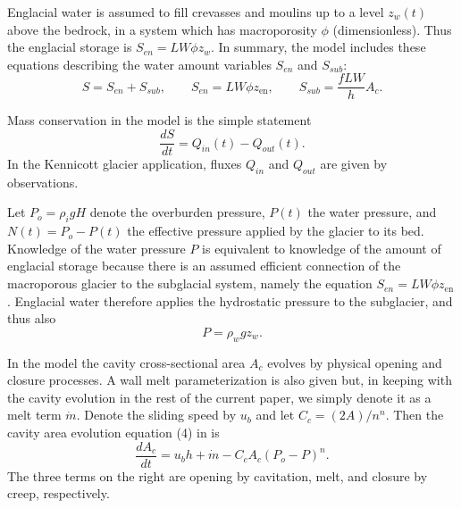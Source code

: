 \documentclass[11pt,final]{amsart}
\newcommand{\zen}{z_{\text{en}}}
\begin{document}
Englacial water is assumed to fill crevasses and moulins up to a level $z_w(t)$ above the bedrock, in a system which has macroporosity $\phi$ (dimensionless).  Thus the englacial storage is $S_{en}=L W \phi z_w$.  In summary, the \cite{Bartholomausetal2011} model includes these equations describing the water amount variables $S_{en}$ and $S_{sub}$:
\begin{equation}
S = S_{en} + S_{sub}, \qquad S_{en} = L W \phi \zen, \qquad S_{sub} = \frac{f L W}{h} A_c.  \label{eq:barth:kinematics}
\end{equation}

Mass conservation in the model is the simple statement  \citep{Bartholomausetal2008}
\begin{equation}
\frac{dS}{dt} = Q_{in}(t) - Q_{out}(t). \label{eq:barth:massconserve}
\end{equation}
In the Kennicott glacier application, fluxes $Q_{in}$ and $Q_{out}$ are given by observations.

Let $P_o=\rho_i g H$ denote the overburden pressure, $P(t)$ the water pressure, and $N(t)=P_o-P(t)$ the effective pressure applied by the glacier to its bed.  Knowledge of the water pressure $P$ is equivalent to knowledge of the amount of englacial storage because there is an assumed efficient connection of the macroporous glacier to the subglacial system, namely the equation $S_{en}=L W \phi \zen$.  Englacial water therefore applies the hydrostatic pressure to the subglacier, and thus also
\begin{equation}
P = \rho_w g z_w.  \label{eq:barth:englacialpressure}
\end{equation}

In the \cite{Bartholomausetal2011} model the cavity cross-sectional area $A_c$ evolves by physical opening and closure processes.  A wall melt parameterization is also given but, in keeping with the cavity evolution in the rest of the current paper, we simply denote it as a melt term $\dot m$.  Denote the sliding speed by $u_b$ and let $C_c = (2 A)/n^n$.  Then the cavity area evolution equation (4) in \cite{Bartholomausetal2011} is
\begin{equation}
\frac{dA_c}{dt} = u_b h + \dot m - C_c A_c (P_o-P)^n.  \label{eq:barth:cavityevolution}
\end{equation}
The three terms on the right are opening by cavitation, melt, and closure by creep, respectively.
\end{document}
